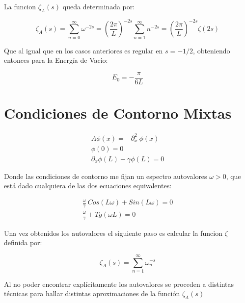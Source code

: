 La funcion $\zeta _A (s)$ queda determinada por:

\begin{equation}
\zeta _A (s) = 
\sum _{n=0} ^{\infty} \omega ^{-2s} =  
\left( \frac{2 \pi}{L} \right) ^{-2s} \sum _{n=1} ^{\infty} n ^{-2s} = 
\left( \frac{2 \pi}{L} \right) ^{-2s} \zeta (2s)
\end{equation}

Que al igual que en los casos anteriores es regular en $s=-1/2$, obteniendo entonces para la Energía de Vacio:

\begin{equation}
E _0 = - \frac{\pi}{6 L}
\end{equation}

\section{Condiciones de Contorno Mixtas}

\begin{equation}
\begin{array}{c}
    A \phi (x) = - \partial ^2 _x \ \phi (x)  \\
    \phi (0) = 0 \\ 
    \partial _x \phi (L) + \gamma \phi (L) = 0
\end{array}
\end{equation}

Donde las condiciones de contorno me fijan un espectro autovalores $\omega > 0 $, que está dado cualquiera de las dos ecuaciones equivalentes: 

\begin{equation}
\begin{array}{cc}
    \frac{\omega}{\gamma}  \ Cos( L \omega ) +   Sin( L \omega ) = 0 \\
    \frac{\omega}{\gamma}  + Tg(\omega L )  = 0 
\label{autovalores}
\end{array}
\end{equation}

Una vez obtenidos los autovalores el siguiente paso es calcular la funcion $\zeta$ definida por:

\begin{equation}
    \zeta _ {A } (s) = \sum_{n = 1} ^{ \infty } \omega _n ^ {-s}
\end{equation}

Al no poder encontrar explícitamente los autovalores se proceden a distintas técnicas para hallar distintas aproximaciones de la función $\zeta _A (s)$

